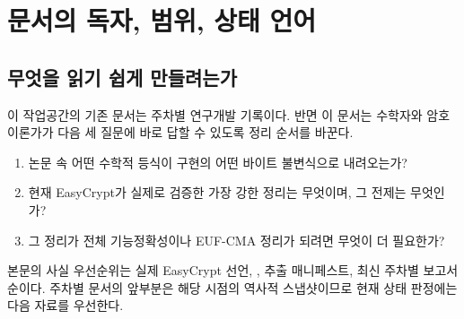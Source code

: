 \section{문서의 독자, 범위, 상태 언어}
\label{sec:orientation}

\subsection{무엇을 읽기 쉽게 만들려는가}

이 작업공간의 기존  문서는 주차별 연구개발 기록이다.
반면 이 문서는 수학자와 암호이론가가 다음 세 질문에 바로 답할 수 있도록
정리 순서를 바꾼다.

\begin{enumerate}
  \item 논문 속 어떤 수학적 등식이 구현의 어떤 바이트 불변식으로 내려오는가?
  \item 현재 EasyCrypt가 실제로 검증한 가장 강한 정리는 무엇이며, 그 전제는
        무엇인가?
  \item 그 정리가 전체 기능정확성이나 EUF-CMA 정리가 되려면 무엇이 더
        필요한가?
\end{enumerate}

본문의 사실 우선순위는 실제 EasyCrypt 선언, ,
추출 매니페스트, 최신 주차별 보고서 순이다. 주차별 문서의 앞부분은 해당
시점의 역사적 스냅샷이므로 현재 상태 판정에는 다음 자료를 우선한다.

